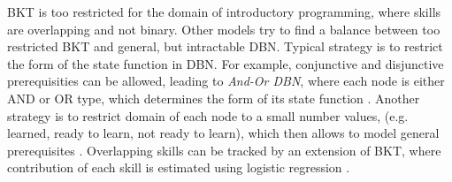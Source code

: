 

BKT is too restricted for the domain of introductory programming, where skills are
overlapping and not binary. Other models try to find a balance
between too restricted BKT and general, but intractable DBN.
Typical strategy is to restrict the form of the state function in DBN.
For example, conjunctive and disjunctive prerequisities can be allowed,
leading to \emph{And-Or DBN}, where each node is either AND or OR type, which
determines the form of its state function
\cite[section 5.1.2]{student-models-review-2012}. %
Another strategy is to restrict domain of each node to a small number values,
(e.g. learned, ready to learn, not ready to learn),
which then allows to model general prerequisites %
\cite{its-programming}.
Overlapping skills can be tracked by an extension of BKT, where contribution
of each skill is estimated using logistic regression \cite{bn-logreg}.


